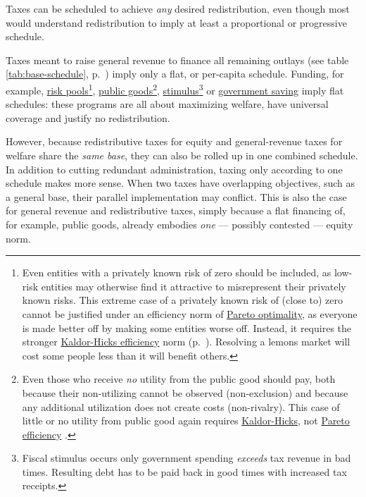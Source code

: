 \begin{description}
	Taxes can be scheduled to achieve \emph{any} desired redistribution, even though most would understand redistribution to imply at least a proportional or progressive schedule.

	Taxes meant to raise general revenue to finance all remaining outlays (see table \ref{tab:base-schedule}, p.~\pageref{tab:base-schedule}) imply only a flat, or per-capita schedule. Funding, for example, \hyperref[sec:adverse-selection]{risk pools}\footnote{
		Even entities with a privately known risk of zero should be included, as low-risk entities may otherwise find it attractive to misrepresent their privately known risks. This extreme case of a privately known risk of (close to) zero cannot be justified under an efficiency norm of \hyperref[sec:Pareto]{Pareto optimality}, as everyone is made better off by making some entities worse off. Instead, it requires the stronger \hyperref[sec:KaldorHicks]{Kaldor-Hicks efficiency} norm (p.~\pageref{sec:Efficiency})\citep{Kaldor1939,Hicks1939}. Resolving a lemons market will cost some people less than it will benefit others.},
	\hyperref[sec:public-good]{public goods}\footnote{
		Even those who receive \emph{no} utility from the public good should pay, both because their non-utilizing cannot be observed (non-exclusion) and because any additional utilization does not create costs (non-rivalry). This case of little or no utility from public good again requires \hyperref[sec:KaldorHicks]{Kaldor-Hicks}, not \hyperref[sec:Pareto]{Pareto efficiency} \citep{Kaldor1939,Hicks1939}.},
	\hyperref[sec:fiscal-stimulus]{stimulus}\footnote{
		Fiscal stimulus occurs only government spending \emph{exceeds} tax revenue in bad times. Resulting debt has to be paid back in good times with increased tax receipts.}
	or \hyperref[sec:government-saves]{government saving} imply flat schedules: these programs are all about maximizing welfare, have universal coverage and justify no redistribution.

	However, %
	 \label{sec:redistributionandrevenueareone} because redistributive taxes for equity and general-revenue taxes for welfare share the \emph{same base}, they can also be rolled up in one combined schedule. In addition to cutting redundant administration, taxing only according to one schedule makes more sense. When two taxes have overlapping objectives, such as a general base, their parallel implementation may conflict. This is also the case for general revenue and redistributive taxes, simply because a flat financing of, for example, public goods, already embodies \emph{one} --- possibly contested --- equity norm.

\end{description}


